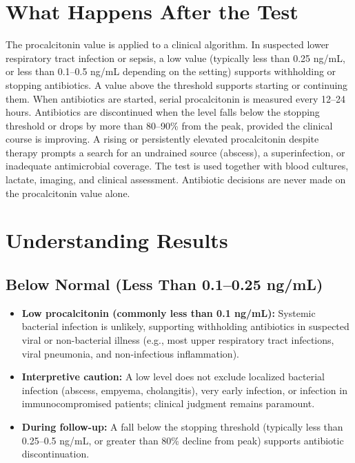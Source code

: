 \section*{What Happens After the Test}
The procalcitonin value is applied to a clinical algorithm. In suspected lower respiratory tract infection or sepsis, a low value (typically less than 0.25 ng/mL, or less than 0.1--0.5 ng/mL depending on the setting) supports withholding or stopping antibiotics. A value above the threshold supports starting or continuing them. When antibiotics are started, serial procalcitonin is measured every 12--24 hours. Antibiotics are discontinued when the level falls below the stopping threshold or drops by more than 80--90\% from the peak, provided the clinical course is improving. A rising or persistently elevated procalcitonin despite therapy prompts a search for an undrained source (abscess), a superinfection, or inadequate antimicrobial coverage. The test is used together with blood cultures, lactate, imaging, and clinical assessment. Antibiotic decisions are never made on the procalcitonin value alone.

\section*{Understanding Results}

\subsection*{Below Normal (Less Than 0.1--0.25 ng/mL)}
\begin{itemize}
  \item \textbf{Low procalcitonin (commonly less than 0.1 ng/mL):} Systemic bacterial infection is unlikely, supporting withholding antibiotics in suspected viral or non-bacterial illness (e.g., most upper respiratory tract infections, viral pneumonia, and non-infectious inflammation).
  \item \textbf{Interpretive caution:} A low level does not exclude localized bacterial infection (abscess, empyema, cholangitis), very early infection, or infection in immunocompromised patients; clinical judgment remains paramount.
  \item \textbf{During follow-up:} A fall below the stopping threshold (typically less than 0.25--0.5 ng/mL, or greater than 80\% decline from peak) supports antibiotic discontinuation.
\end{itemize}

